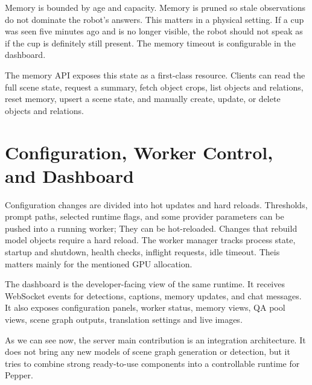 Memory is bounded by age and capacity. Memory is pruned so stale observations do not dominate the robot's answers. This matters in a physical setting. If a cup was seen five minutes ago and is no longer visible, the robot should not speak as if the cup is definitely still present. The memory timeout is configurable in the dashboard.

The memory API exposes this state as a first-class resource. Clients can read the full scene state, request a summary, fetch object crops, list objects and relations, reset memory, upsert a scene state, and manually create, update, or delete objects and relations. %

\section{Configuration, Worker Control, and Dashboard}\label{sec:server-worker-runtime}

Configuration changes are divided into hot updates and hard reloads. Thresholds, prompt paths, selected runtime flags, and some provider parameters can be pushed into a running worker; They can be hot-reloaded. Changes that rebuild model objects require a hard reload. The worker manager tracks process state, startup and shutdown, health checks, inflight requests, idle timeout. Theis matters mainly for the mentioned GPU allocation.

The dashboard is the developer-facing view of the same runtime. It receives WebSocket events for detections, captions, memory updates, and chat messages. It also exposes configuration panels, worker status, memory views, QA pool views, scene graph outputs, translation settings and live images.

As we can see now, the server main contribution is an integration architecture. It does not bring any new models of scene graph generation or detection, but it tries to combine strong ready-to-use components into a controllable runtime for Pepper. %
